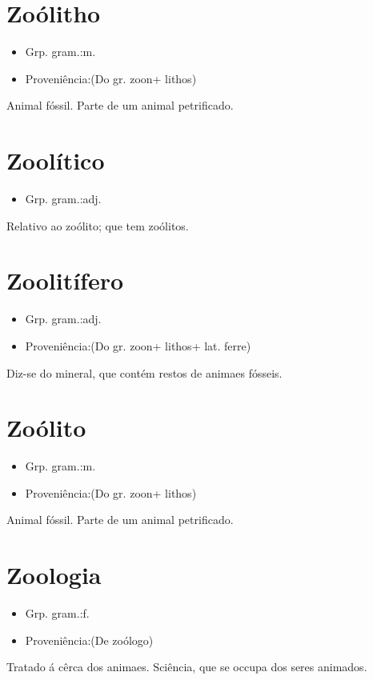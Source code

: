 \section{Zoólitho}
\begin{itemize}
\item {Grp. gram.:m.}
\end{itemize}
\begin{itemize}
\item {Proveniência:(Do gr. \textunderscore zoon\textunderscore  + \textunderscore lithos\textunderscore )}
\end{itemize}
Animal fóssil.
Parte de um animal petrificado.
\section{Zoolítico}
\begin{itemize}
\item {Grp. gram.:adj.}
\end{itemize}
Relativo ao zoólito; que tem zoólitos.
\section{Zoolitífero}
\begin{itemize}
\item {Grp. gram.:adj.}
\end{itemize}
\begin{itemize}
\item {Proveniência:(Do gr. \textunderscore zoon\textunderscore  + \textunderscore lithos\textunderscore  + lat. \textunderscore ferre\textunderscore )}
\end{itemize}
Diz-se do mineral, que contém restos de animaes fósseis.
\section{Zoólito}
\begin{itemize}
\item {Grp. gram.:m.}
\end{itemize}
\begin{itemize}
\item {Proveniência:(Do gr. \textunderscore zoon\textunderscore  + \textunderscore lithos\textunderscore )}
\end{itemize}
Animal fóssil.
Parte de um animal petrificado.
\section{Zoologia}
\begin{itemize}
\item {Grp. gram.:f.}
\end{itemize}
\begin{itemize}
\item {Proveniência:(De \textunderscore zoólogo\textunderscore )}
\end{itemize}
Tratado á cêrca dos animaes.
Sciência, que se occupa dos seres animados.
